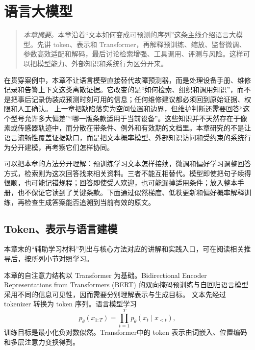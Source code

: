 ﻿\chapter{语言大模型}
\begin{quote}\small
\textit{本章摘要。}本章沿着“文本如何变成可预测的序列”这条主线介绍语言大模型。先讲 token、表示和 Transformer，再解释预训练、缩放、监督微调、参数高效适配和解码，最后讨论检索增强、工具调用、评测与风险。这样可以把模型能力、外部知识和系统行为区分开来。
\end{quote}
在贯穿案例中，本章不让语言模型直接替代故障预测器，而是处理设备手册、维修记录和告警上下文这类离散证据。它改变的是“如何检索、组织和调用知识”，而不是把事后记录伪装成预测时刻可用的信息；任何维修建议都必须回到原始证据、权限和人工确认。
上一章把缺陷落实为空间位置和边界，但维护判断还需要回答“这个型号允许多大偏差”“哪一版条款适用于当前设备”。这些知识并不天然存在于像素或传感器轨迹中，而分散在带条件、例外和有效期的文档里。本章研究的不是让语言流畅性覆盖证据缺口，而是把文本概率模型、外部知识访问和受约束的系统行为分开建模，再考察它们怎样协同。

可以把本章的方法分开理解：预训练学习文本怎样接续，微调和偏好学习调整回答方式，检索则为这次回答找来相关资料。三者不能互相替代。模型即使把句子续得很顺，也可能记错规程；回答即使受人欢迎，也可能漏掉适用条件；放入整本手册，也不保证它读到了关键条款。下面通过似然梯度、低秩更新和偏好概率解释训练，再检查生成答案能否追溯到当前有效的原文。
\section{Token、表示与语言建模}

本章末的“辅助学习材料”列出与核心方法对应的讲解和实践入口，可在阅读相关推导后，按所列小节对照学习。

本章的自注意力结构以 Transformer 为基础\cite{vaswani2017attention}。Bidirectional Encoder Representations from Transformers (BERT) 的双向掩码预训练与自回归语言模型采用不同的信息可见性，因而需要分别理解表示与生成目标\cite{devlin2019bert,brown2020gpt3}。
文本先经过 tokenizer 转换为 token 序列。语言模型学习
\begin{equation}
 p_\theta(x_{1:T})=\prod_{t=1}^{T}p_\theta(x_t\mid x_{<t}),\label{eq:llm-chain-probability}
\end{equation}
训练目标是最小化负对数似然。Transformer中的 token 表示由词嵌入、位置编码和多层注意力变换得到。


